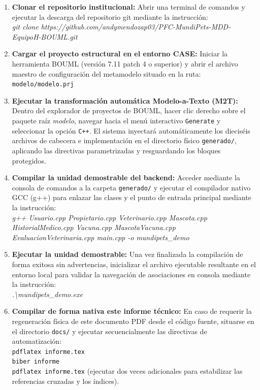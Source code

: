 \documentclass[journal,onecolumn]{IEEEtran}
\begin{document}
	\begin{enumerate}[leftmargin=*]
		\item \textbf{Clonar el repositorio institucional:} Abrir una terminal de comandos y ejecutar la descarga del repositorio git mediante la instrucción: \\
		\textit{git clone https://github.com/andymendozap03/PFC-MundiPets-MDD-EquipoH-BOUML.git}
		
		\item \textbf{Cargar el proyecto estructural en el entorno CASE:} Iniciar la herramienta BOUML (versión 7.11 patch 4 o superior) y abrir el archivo maestro de configuración del metamodelo situado en la ruta: \\
		\texttt{modelo/modelo.prj}
		
		\item \textbf{Ejecutar la transformación automática Modelo-a-Texto (M2T):} Dentro del explorador de proyectos de BOUML, hacer clic derecho sobre el paquete raíz \textit{modelo}, navegar hacia el menú interactivo \texttt{Generate} y seleccionar la opción \texttt{C++}. El sistema inyectará automáticamente los dieciséis archivos de cabecera e implementación en el directorio físico \texttt{generado/}, aplicando las directivas parametrizadas y resguardando los bloques protegidos.
		
		\item \textbf{Compilar la unidad demostrable del backend:} Acceder mediante la consola de comandos a la carpeta \texttt{generado/} y ejecutar el compilador nativo GCC (g++) para enlazar las clases y el punto de entrada principal mediante la instrucción: \\
		\textit{g++ Usuario.cpp Propietario.cpp Veterinario.cpp Mascota.cpp HistorialMedico.cpp Vacuna.cpp MascotaVacuna.cpp EvaluacionVeterinaria.cpp main.cpp -o mundipets\_demo}
		
		\item \textbf{Ejecutar la unidad demostrable:} Una vez finalizada la compilación de forma exitosa sin advertencias, inicializar el archivo ejecutable resultante en el entorno local para validar la navegación de asociaciones en consola mediante la instrucción: \\
		\textit{.\textbackslash mundipets\_demo.exe}
		
		\item \textbf{Compilar de forma nativa este informe técnico:} En caso de requerir la regeneración física de este documento PDF desde el código fuente, situarse en el directorio \texttt{docs/} y ejecutar secuencialmente las directivas de automatización: \\
		\texttt{pdflatex informe.tex} \\
		\texttt{biber informe} \\
		\texttt{pdflatex informe.tex} (ejecutar dos veces adicionales para estabilizar las referencias cruzadas y los índices).
	\end{enumerate}
	
	
\end{document}
